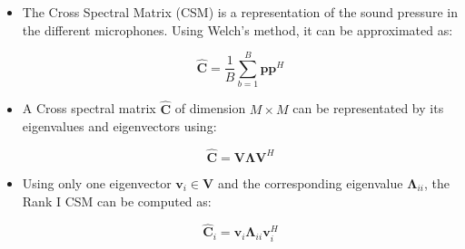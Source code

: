 \documentclass[12pt,pdftex,16x10]{elpres} %
\begin{document}
\begin{psli}
  \begin{itemize}
    \item The Cross Spectral Matrix (CSM) is a representation of the sound pressure in the different microphones. Using Welch's method, it can be approximated as:

    
    \begin{equation}
        \label{csm}
        \hat{\mathbf{C}} = \frac{1}{B} \sum_{b = 1}^{B} \mathbf{p}\mathbf{p}^H
    \end{equation}
    \item A Cross spectral matrix $\hat{\mathbf{C}}$ of dimension $M \times M$ can be representated by its eigenvalues and eigenvectors using:

    \begin{equation}
        \label{eigendecomposition}
        \hat{\mathbf{C}} = \mathbf{V} \mathbf{\Lambda} \mathbf{V}^H
    \end{equation}

    \item Using only one eigenvector $\mathbf{v}_i \in \mathbf{V}$ and the corresponding eigenvalue $\mathbf{\Lambda}_{ii}$, the Rank I CSM can be computed as:
    
    \begin{equation}
        \label{rank_I_csm}
        \hat{\mathbf{C}}_i = \mathbf{v}_i \mathbf{\Lambda}_{ii} \mathbf{v}_{i}^{H}
    \end{equation}
  
  \end{itemize}
\end{psli}
\end{document}
